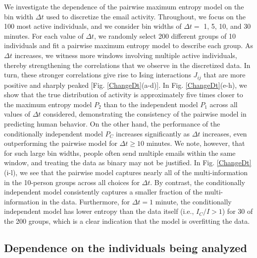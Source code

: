 \documentclass[aps,reprint,superscriptaddress,amsmath,amssymb,longbibliography]{revtex4-1}
\begin{document}
We investigate the dependence of the pairwise maximum entropy model on the bin width $\Delta t$ used to discretize the email activity. Throughout, we focus on the 100 most active individuals, and we consider bin widths of $\Delta t = $ 1, 5, 10, and 30 minutes. For each value of $\Delta t$, we randomly select 200 different groups of 10 individuals and fit a pairwise maximum entropy model to describe each group. As $\Delta t$ increases, we witness more windows involving multiple active individuals, thereby strengthening the correlations that we observe in the discretized data. In turn, these stronger correlations give rise to Ising interactions $J_{ij}$ that are more positive and sharply peaked [Fig. \ref{ChangeDt}(a-d)]. In Fig. \ref{ChangeDt}(e-h), we show that the true distribution of activity is approximately five times closer to the maximum entropy model $P_2$ than to the independent model $P_1$ across all values of $\Delta t$ considered, demonstrating the consistency of the pairwise model in predicting human behavior. On the other hand, the performance of the conditionally independent model $P_C$ increases significantly as $\Delta t$ increases, even outperforming the pairwise model for $\Delta t \ge 10$ minutes. We note, however, that for such large bin widths, people often send multiple emails within the same window, and treating the data as binary may not be justified. In Fig. \ref{ChangeDt}(i-l), we see that the pairwise model captures nearly all of the multi-information in the 10-person groups across all choices for $\Delta t$. By contrast, the conditionally independent model consistently captures a smaller fraction of the multi-information in the data. Furthermore, for $\Delta t = 1$ minute, the conditionally independent model has lower entropy than the data itself (i.e., $I_C/ I > 1$) for 30 of the 200 groups, which is a clear indication that the model is overfitting the data.

\subsection{Dependence on the individuals being analyzed}

\label{Users}
\end{document}
